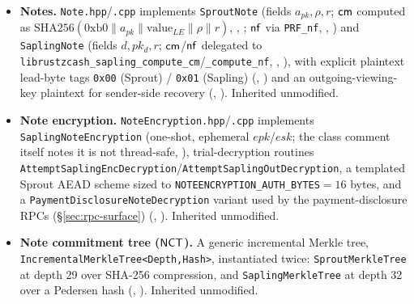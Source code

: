 \begin{itemize}
\item \textbf{Notes.} \texttt{Note.hpp}\slash\texttt{.cpp} implements \texttt{SproutNote} (fields
  $a_{pk},\rho,r$; $\mathsf{cm}$ computed as $\mathrm{SHA256}(0\mathrm{xb0} \| a_{pk} \| \mathrm{value}_{LE}
  \| \rho \| r)$, \shipped, ; $\mathsf{nf}$ via \texttt{PRF\_nf},
  \shipped, ) and \texttt{SaplingNote} (fields $d, pk_d, r$;
  $\mathsf{cm}$/$\mathsf{nf}$ delegated to \texttt{librustzcash\_sapling\_compute\_cm}\slash\texttt{\_compute\_nf}, \shipped,
  ), with explicit plaintext lead-byte tags \texttt{0x00}
  (Sprout) / \texttt{0x01} (Sapling) (\shipped, ) and
  an outgoing-viewing-key plaintext for sender-side recovery (\shipped,
  ). Inherited unmodified.
\item \textbf{Note encryption.} \texttt{Note\allowbreak{}Encryption.\allowbreak{}hpp}\slash\texttt{.cpp} implements
  \texttt{Sapling\allowbreak{}Note\allowbreak{}Encryption} (one-shot, ephemeral $epk$/$esk$; the class comment itself notes it
  is not thread-safe, ), trial-decryption routines
  \texttt{Attempt\allowbreak{}Sapling\allowbreak{}Enc\allowbreak{}Decryption}\slash\texttt{Attempt\allowbreak{}Sapling\allowbreak{}Out\allowbreak{}Decryption}, a templated Sprout
  AEAD scheme sized to \texttt{NOTEENCRYPTION\_AUTH\_BYTES}$=16$ bytes, and a
  \texttt{Payment\allowbreak{}Disclosure\allowbreak{}Note\allowbreak{}Decryption} variant used by the payment-disclosure RPCs
  (\S\ref{sec:rpc-surface}) (\shipped, ).
  Inherited unmodified.
\item \textbf{Note commitment tree ($\mathsf{NCT}$).} A generic incremental Merkle tree,
  \texttt{Incremental\allowbreak{}Merkle\allowbreak{}Tree<Depth,Hash>}, instantiated twice: \texttt{Sprout\allowbreak{}Merkle\allowbreak{}Tree} at depth
  29 over SHA-256 compression, and \texttt{Sapling\allowbreak{}Merkle\allowbreak{}Tree} at depth 32 over a Pedersen hash
  (\shipped, ). Inherited unmodified.

\end{itemize}
